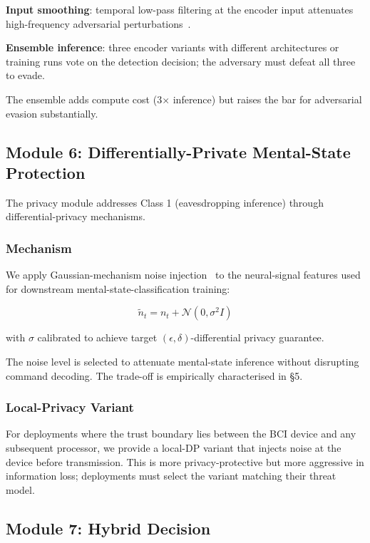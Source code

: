 \documentclass[sigconf,nonacm]{acmart}
\begin{document}
\textbf{Input smoothing}: temporal low-pass filtering at the
encoder input attenuates high-frequency adversarial
perturbations~\cite{karimi2024timeseriesadv}.

\textbf{Ensemble inference}: three encoder variants with different
architectures or training runs vote on the detection decision; the
adversary must defeat all three to evade.

The ensemble adds compute cost (3$\times$ inference) but raises
the bar for adversarial evasion substantially.

\subsection{Module 6: Differentially-Private Mental-State Protection}

The privacy module addresses Class 1 (eavesdropping inference)
through differential-privacy mechanisms.

\subsubsection{Mechanism}

We apply Gaussian-mechanism noise injection~\cite{abadi2016deep,
ji2024dpneural} to the neural-signal features used for downstream
mental-state-classification training:

\begin{equation}
  \tilde{n}_t = n_t + \mathcal{N}(0, \sigma^2 I)
\end{equation}

with $\sigma$ calibrated to achieve target
$(\epsilon, \delta)$-differential privacy guarantee.

The noise level is selected to attenuate mental-state inference
without disrupting command decoding. The trade-off is empirically
characterised in §5.

\subsubsection{Local-Privacy Variant}

For deployments where the trust boundary lies between the BCI
device and any subsequent processor, we provide a local-DP
variant that injects noise at the device before transmission. This
is more privacy-protective but more aggressive in information loss;
deployments must select the variant matching their threat model.

\subsection{Module 7: Hybrid Decision}
\end{document}
